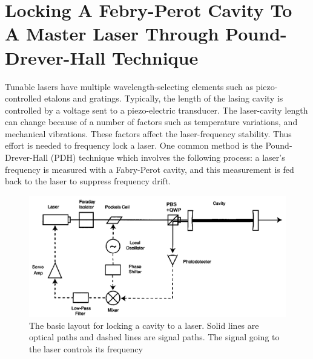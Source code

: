 \documentclass[12pt]{report}
\begin{document}
\chapter{Locking A Febry-Perot Cavity To A Master Laser Through Pound-Drever-Hall Technique}
Tunable lasers have multiple wavelength-selecting elements such as piezo-controlled etalons and gratings. Typically, the length of the lasing cavity is controlled by a voltage sent to a piezo-electric transducer. The laser-cavity length can change because of a number of factors such as temperature variations, and mechanical vibrations. These factors affect the laser-frequency stability. Thus effort is needed to frequency lock a laser. One common method is the Pound-Drever-Hall (PDH) technique which involves the following process: a laser's frequency is measured with a Fabry-Perot cavity, and this measurement is fed back to the laser to suppress frequency drift\cite{PDH1983}\cite{PDHintro}.
\par
\begin{figure}[H]
    \centering
    \includegraphics[width=.8\textwidth]{PDHlayout.png}
    \caption{The basic layout for locking a cavity to a laser. Solid lines are optical paths and dashed lines are signal paths. The signal going to the laser controls its frequency \cite{PDHintro}}
    \label{fig:PDHlayout}
\end{figure}
\end{document}
